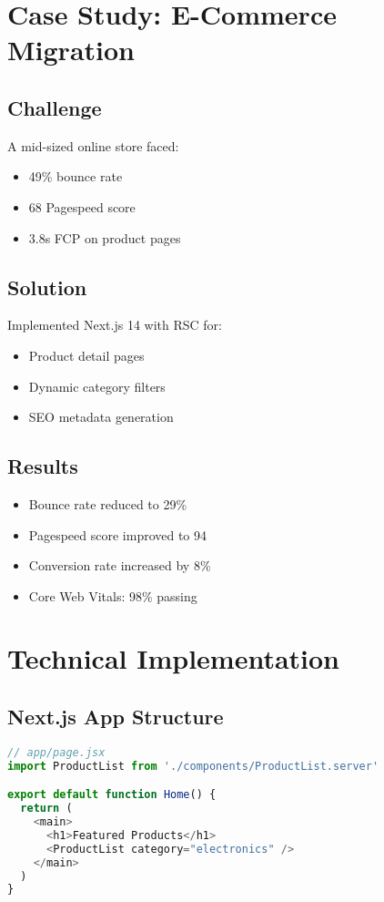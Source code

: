 \documentclass[12pt]{article}
\begin{document}
\section{Case Study: E-Commerce Migration}
\subsection*{Challenge}
A mid-sized online store faced:
\begin{itemize}
    \item 49\% bounce rate
    \item 68 Pagespeed score
    \item 3.8s FCP on product pages
\end{itemize}

\subsection*{Solution}
Implemented Next.js 14 with RSC for:
\begin{itemize}
    \item Product detail pages
    \item Dynamic category filters
    \item SEO metadata generation
\end{itemize}

\subsection*{Results}
\begin{itemize}
    \item Bounce rate reduced to 29\%
    \item Pagespeed score improved to 94
    \item Conversion rate increased by 8\%
    \item Core Web Vitals: 98\% passing
\end{itemize}

\section{Technical Implementation}
\subsection*{Next.js App Structure}
\begin{lstlisting}[language=JavaScript]
// app/page.jsx
import ProductList from './components/ProductList.server'

export default function Home() {
  return (
    <main>
      <h1>Featured Products</h1>
      <ProductList category="electronics" />
    </main>
  )
}
\end{lstlisting}
\end{document}
